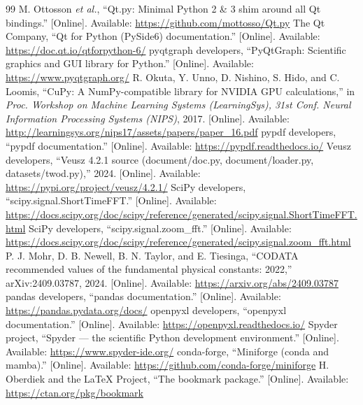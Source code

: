\documentclass[10pt,letterpaper]{article}
\numberwithin{equation}{section}
\begin{document}
\begin{thebibliography}{99}
 M. Ottosson \emph{et al.}, ``Qt.py: Minimal Python 2 \& 3 shim around all Qt bindings.'' [Online]. Available: \url{https://github.com/mottosso/Qt.py}
 The Qt Company, ``Qt for Python (PySide6) documentation.'' [Online]. Available: \url{https://doc.qt.io/qtforpython-6/}
 pyqtgraph developers, ``PyQtGraph: Scientific graphics and GUI library for Python.'' [Online]. Available: \url{https://www.pyqtgraph.org/}
 R. Okuta, Y. Unno, D. Nishino, S. Hido, and C. Loomis, ``CuPy: A NumPy-compatible library for NVIDIA GPU calculations,'' in \emph{Proc. Workshop on Machine Learning Systems (LearningSys), 31st Conf. Neural Information Processing Systems (NIPS)}, 2017. [Online]. Available: \url{http://learningsys.org/nips17/assets/papers/paper_16.pdf}
 pypdf developers, ``pypdf documentation.'' [Online]. Available: \url{https://pypdf.readthedocs.io/}
 Veusz developers, ``Veusz 4.2.1 source (document/doc.py, document/loader.py, datasets/twod.py),'' 2024. [Online]. Available: \url{https://pypi.org/project/veusz/4.2.1/}
 SciPy developers, ``scipy.signal.ShortTimeFFT.'' [Online]. Available: \url{https://docs.scipy.org/doc/scipy/reference/generated/scipy.signal.ShortTimeFFT.html}
 SciPy developers, ``scipy.signal.zoom\_fft.'' [Online]. Available: \url{https://docs.scipy.org/doc/scipy/reference/generated/scipy.signal.zoom_fft.html}
 P. J. Mohr, D. B. Newell, B. N. Taylor, and E. Tiesinga, ``CODATA recommended values of the fundamental physical constants: 2022,'' arXiv:2409.03787, 2024. [Online]. Available: \url{https://arxiv.org/abs/2409.03787}
 pandas developers, ``pandas documentation.'' [Online]. Available: \url{https://pandas.pydata.org/docs/}
 openpyxl developers, ``openpyxl documentation.'' [Online]. Available: \url{https://openpyxl.readthedocs.io/}
 Spyder project, ``Spyder --- the scientific Python development environment.'' [Online]. Available: \url{https://www.spyder-ide.org/}
 conda-forge, ``Miniforge (conda and mamba).'' [Online]. Available: \url{https://github.com/conda-forge/miniforge}
 H. Oberdiek and the LaTeX Project, ``The bookmark package.'' [Online]. Available: \url{https://ctan.org/pkg/bookmark}
\end{thebibliography}
\end{document}
